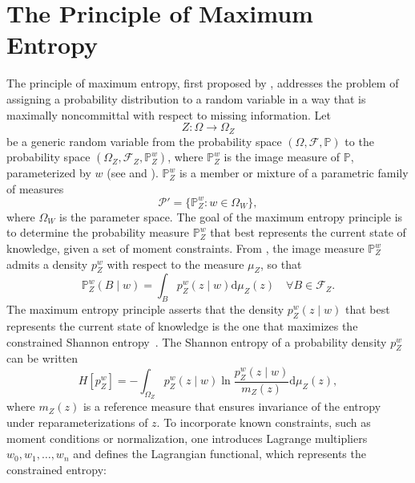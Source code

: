 \section{The Principle of Maximum Entropy}
\label{sec:maxent}
The principle of maximum entropy, first proposed by \citet{Jaynes1957}, addresses the problem of assigning a probability distribution to a random variable in a way that is maximally noncommittal with respect to missing information. Let
\begin{equation}
	Z\colon \Omega \to \Omega_Z
\end{equation}
be a generic random variable from the probability space $(\Omega, \mathcal{F}, \mathbb{P})$ to the probability space $(\Omega_Z,\mathcal{F}_Z, \mathbb{P}_{Z}^w)$, where $\mathbb{P}_{Z}^w$ is the image measure of $\mathbb{P}$, parameterized by $w$ (see  and ). $\mathbb{P}_{Z}^w$ is a member or mixture of a parametric family of measures
\begin{equation}
	\mathcal{P}' = \{ \mathbb{P}^w_{Z} \colon w \in \Omega_W\},
\end{equation}
where $\Omega_W$ is the parameter space. The goal of the maximum entropy principle is to determine the probability measure $\mathbb{P}_{Z}^w$ that best represents the current state of knowledge, given a set of moment constraints. From , the image measure $\mathbb{P}_{Z}^w$ admits a density $p_{Z}^w$ with respect to the measure $\mu_Z$, so that
\begin{equation}
	\mathbb{P}_{Z}^w(B\mid w) = \int_B p_{Z}^w(z\mid w) \mathrm{d}\mu_Z(z)\quad \forall B\in \mathcal{F}_Z.
	\label{eq:max_ent_probability_measure}
\end{equation}
The maximum entropy principle asserts that the density $p_{Z}^w(z \mid w)$ that best represents the current state of knowledge is the one that maximizes the constrained Shannon entropy~\citep{Sivia2006}. The Shannon entropy of a probability density $p_{Z}^w$ can be written
\begin{equation}
	H[p^w_{Z}] = - \int_{\Omega_Z} p^w_{Z}(z \mid w) 
	\ln \frac{p_{Z}^w(z \mid w)}{m_Z(z)}  \mathrm{d}\mu_Z(z),
\end{equation}
where $m_Z(z)$ is a reference measure that ensures invariance of the entropy under reparameterizations of $z$. To incorporate known constraints, such as moment conditions or normalization, one introduces Lagrange multipliers $w_0, w_1, \dots, w_n$ and defines the Lagrangian functional, which represents the constrained entropy:
